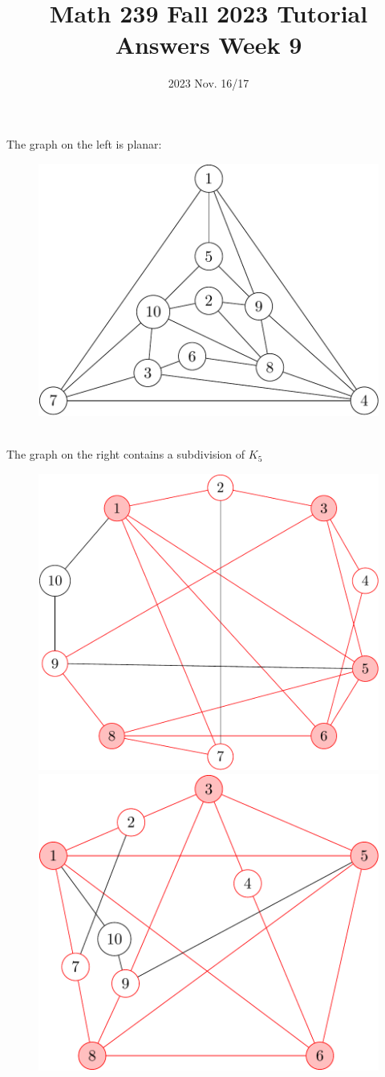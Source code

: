 \title{Math 239 Fall 2023 Tutorial Answers Week 9}

\date{2023 Nov. 16/17}
\maketitle

\begin{enumerate}
        The graph on the left is planar:
        \begin{figure}[h]
        \centering
            \includegraphics[width=.45\textwidth]{planar_soln.png}
        \end{figure}\\
        The graph on the right contains a subdivision of $K_{5}$
        \begin{figure}[h]
        \centering
             \includegraphics[width=.45\textwidth]{nonplanar_soln.png}\hfill
             \includegraphics[width=.45\textwidth]{nonplanar_soln2.png}
        \end{figure}


\end{enumerate}

